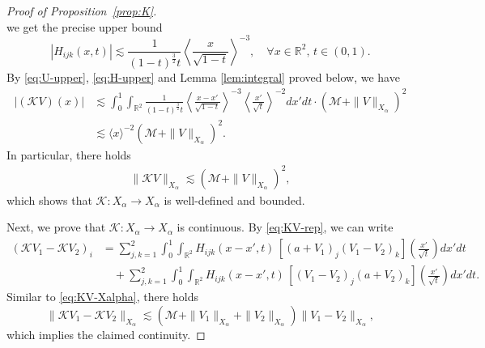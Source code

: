 \documentclass[12pt,reqno]{amsart}
\theoremstyle{plain}
\theoremstyle{definition}
\newcommand{\R}{\mathbb{R}}
\newcommand{\M}{\mathcal{M}}
\renewcommand{\:}{\colon}
\numberwithin{equation}{section}
\numberwithin{figure}{section}
\begin{document}
\begin{proof}[Proof of Proposition~\ref{prop:K}]
\begin{equation}
    \end{equation}
    we get the precise upper bound
    \begin{equation} \label{eq:H-upper}
        |H_{ijk}(x,t)| \lesssim \frac{1}{(1-t)^\frac32 t} \left\langle \frac{x}{\sqrt{1-t}} \right\rangle^{-3}, \quad \forall x\in \R^2, \, t\in (0,1).
    \end{equation}
    By \eqref{eq:U-upper}, \eqref{eq:H-upper}  and Lemma \ref{lem:integral} proved below, we have 
    \begin{align} \label{eq:KV-extra-decay}
        |(\mathcal{K}V)(x)| &\lesssim \int_0^1 \int_{\R^2} \frac{1}{(1-t)^\frac32 t} \left \langle \frac{x-x'}{\sqrt{1-t}} \right \rangle^{-3} \left \langle \frac{x'}{\sqrt{t}} \right\rangle^{-2}  dx'dt \cdot (\M+\|V\|_{X_\alpha})^2 \nonumber \\
        &\lesssim \langle x \rangle^{-2} (\M+\|V\|_{X_\alpha})^2.
    \end{align}
    In particular, there holds
    \begin{align} \label{eq:KV-Xalpha}
        \|\mathcal{K}V\|_{X_\alpha} \lesssim (\M+\|V\|_{X_\alpha})^2,
    \end{align}
    which shows that $\mathcal{K}:X_\alpha \to X_\alpha$ is well-defined and bounded. 
    
    Next, we prove that $\mathcal{K}:X_\alpha \to X_\alpha$ is continuous. By \eqref{eq:KV-rep}, we can write
    \begin{align} \label{eq:KV-diff-rep}
        (\mathcal{K}V_1 - \mathcal{K} V_2)_i &= \sum_{j,k=1}^2 \int_0^1 \int_{\R^2} H_{ijk} (x-x',t) \, \left[(a+V_1)_j (V_1-V_2)_k\right]\left(\frac{x'}{\sqrt{t}}\right) dx' dt \nonumber \\
        &\quad + \sum_{j,k=1}^2 \int_0^1 \int_{\R^2} H_{ijk} (x-x',t) \, \left[(V_1-V_2)_j (a+V_2)_k\right]\left(\frac{x'}{\sqrt{t}}\right) dx' dt.
    \end{align}
    Similar to \eqref{eq:KV-Xalpha}, there holds
    \begin{equation}
         \|\mathcal{K}V_1 - \mathcal{K}V_2\|_{X_\alpha} \lesssim (\M +\|V_1\|_{X_\alpha}+\|V_2\|_{X_\alpha})\|V_1-V_2\|_{X_\alpha},
    \end{equation}
    which implies the claimed continuity.


\end{proof}
\end{document}

